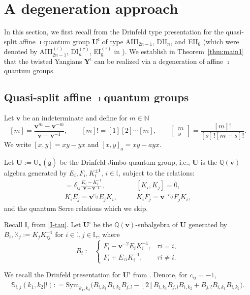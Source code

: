 \documentclass[11pt,reqno]{amsart}
\numberwithin{equation}{section}
\theoremstyle{definition}
\theoremstyle{remark}
\newcommand{\bS}{\mathbb{S}}
\newcommand{\g}{\mathfrak{g}}
\newcommand{\wt}{\widehat}
\newcommand{\Sym}{{\mathrm{Sym}}}
\newcommand{\rU}{{\mathrm{U}}}
\newcommand{\Yi}{{\mathbf{Y}^\imath}}
\newcommand{\bv}{{\bm{v}}}
\newcommand{\qbinom}[2]{\begin{bmatrix} #1\\#2 \end{bmatrix} }
\def \I{\mathbb{I}}
\def \N{\mathbb{N}}
\def \Sym{\mathrm{Sym}}
\def \U{\mathbf U}
\def \tUi{\mathbf{U}^\imath}
\def \Q{\mathbb{Q}}
\def \K{\mathbb{K}}
\begin{document}
\section{A degeneration approach}
\label{sec:degen}
In this section, we first recall from \cite{LWZ23b} the Drinfeld type presentation for the quasi-split affine $\imath$quantum group $\tUi$ of type AIII$_{2n-1}$, DII$_n$, and EII$_{6}$ (which were denoted by AIII$_{2n-1}^{(\tau)}$, DI$_{n}^{(\tau)}$,  EI$_{6}^{(\tau)}$ in \cite{LWZ23b}). We establish in Theorem~\ref{thm:main1} that the twisted Yangians $\Yi$ can be realized via a degeneration of affine $\imath$quantum groups.


\subsection{Quasi-split affine $\imath$quantum groups}
Let $\bv$ be an indeterminate and define for $m\in\N$
\[
[m]=\frac{\bv^m-\bv^{-m}}{\bv-\bv^{-1}},\qquad [m]!=[1][2]\cdots[m],\qquad \qbinom{m}{s}=\frac{[m]!}{[s]![m-s]!}.
\]
We write $[x,y]=xy-yx$ and $[x,y]_a=xy-ayx$.

Let $\U:=\rU_\bv(\wt{\g})$ be the Drinfeld-Jimbo quantum group, i.e., $\U$ is the $\Q(\bv)$-algebra generated by $E_i,F_i,K_i^{\pm 1}$, $i\in \I$, subject to the relations:
\begin{align*}
[E_i,F_j]=\delta_{ij}\frac{K_i-K_i^{-1}}{\bv-\bv^{-1}},
&\qquad [K_i,K_j]=0,
\\
K_i E_j=\bv^{c_{ij}}E_jK_i,&\qquad K_i F_j=\bv^{-c_{ij}}F_jK_i,
\end{align*}
and the quantum Serre relations which we skip. 

Recall $\I_\tau$ from \eqref{I-tau}. Let $\tUi$ be the $\Q(\bm v)$-subalgebra of $\U$ generated by $B_i,\K_j:=K_jK_{\tau j}^{-1}$ for $i\in \I, j \in \I_{\tau}$, where 
\[
B_i:=\begin{cases}
F_i-\bv^{-2}E_{i} K_i^{-1},& \tau i=i,
\\
F_i+E_{\tau i} K_i^{-1}, & \tau i\neq i.
\end{cases}
\]

We recall the Drinfeld presentation for $\tUi$ from \cite{LWZ23b}. Denote, for $c_{ij}=-1$,
	\begin{align*}
			\bS_{i,j}(k_1,k_2|l) : = \Sym_{k_1,k_2}\Big(B_{i,k_1}B_{i,k_2}B_{j,l}-[2]B_{i,k_1} B_{j,l} B_{i,k_2} + B_{j,l} B_{i,k_1}B_{i,k_2}\Big).
	\end{align*}
\end{document}
